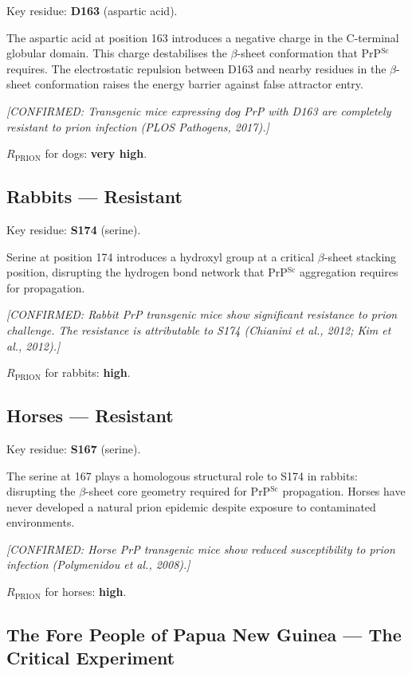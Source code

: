 \documentclass[12pt,a4paper]{article}
\newcommand{\rprion}{$R_{\mathrm{PRION}}$}
\newcommand{\prpsc}{PrP$^{\mathrm{Sc}}$}
\newcommand{\confirmed}[1]{\textit{[CONFIRMED: #1]}}
\begin{document}
Key residue: \textbf{D163} (aspartic acid).

The aspartic acid at position 163 introduces a negative charge in the
C-terminal globular domain. This charge destabilises the $\beta$-sheet
conformation that \prpsc{} requires. The electrostatic repulsion between D163
and nearby residues in the $\beta$-sheet conformation raises the energy
barrier against false attractor entry.

\confirmed{Transgenic mice expressing dog PrP with D163 are completely
resistant to prion infection (PLOS Pathogens, 2017).}

\rprion{} for dogs: \textbf{very high}.

\subsection{Rabbits --- Resistant}

Key residue: \textbf{S174} (serine).

Serine at position 174 introduces a hydroxyl group at a critical
$\beta$-sheet stacking position, disrupting the hydrogen bond network that
\prpsc{} aggregation requires for propagation.

\confirmed{Rabbit PrP transgenic mice show significant resistance to
prion challenge. The resistance is attributable to S174 (Chianini et al.,
2012; Kim et al., 2012).}

\rprion{} for rabbits: \textbf{high}.

\subsection{Horses --- Resistant}

Key residue: \textbf{S167} (serine).

The serine at 167 plays a homologous structural role to S174 in rabbits:
disrupting the $\beta$-sheet core geometry required for \prpsc{}
propagation. Horses have never developed a natural prion epidemic despite
exposure to contaminated environments.

\confirmed{Horse PrP transgenic mice show reduced susceptibility to prion
infection (Polymenidou et al., 2008).}

\rprion{} for horses: \textbf{high}.

\subsection{The Fore People of Papua New Guinea --- The Critical Experiment}
\end{document}
